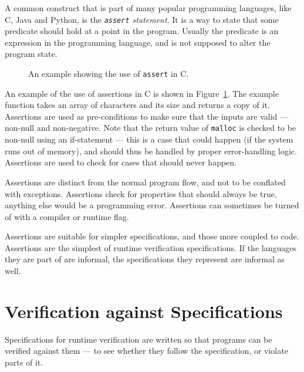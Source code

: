 \documentclass[a4paper,11pt]{kth-mag}
\theoremstyle{definition}
\begin{document}
A common construct that is part of many popular programming languages, like C,
Java and Python, is the \textit{\texttt{assert} statement}. It is a way to
state that some predicate should hold at a point in the program. Usually the
predicate is an expression in the programming language, and is not supposed to
alter the program state.

\begin{figure}[h!]
	\begin{center}
	\begin{minipage}{0.7\textwidth}
    \lstset{language=C}
		
	\end{minipage}
	\end{center}
  \caption{An example showing the use of \texttt{assert} in C.}
	\label{figure-c-assert-example}
\end{figure}

An example of the use of assertions in C is shown in
Figure~\ref{figure-c-assert-example}. The example function takes an array of
characters and its size and returns a copy of it. Assertions are used as
pre-conditions to make sure that the inputs are valid --- non-null and
non-negative. Note that the return value of \texttt{malloc} is checked to be
non-null using an if-statement --- this is a case that could happen (if the
system runs out of memory), and should thus be handled by proper error-handling
logic. Assertions are used to check for cases that should never happen.

Assertions are distinct from the normal program flow, and not to be conflated
with exceptions. Assertions check for properties that should always be true,
anything else would be a programming error. Assertions can sometimes be turned
of with a compiler or runtime flag.

Assertions are suitable for simpler specifications, and those more coupled to
code. Assertions are the simplest of runtime verification specifications. If
the languages they are part of are informal, the specifications they represent
are informal as well.



\section{Verification against Specifications} \label{section-verification}

Specifications for runtime verification are written so that programs can be
verified against them --- to see whether they follow the specification, or
violate parts of it.
\end{document}

